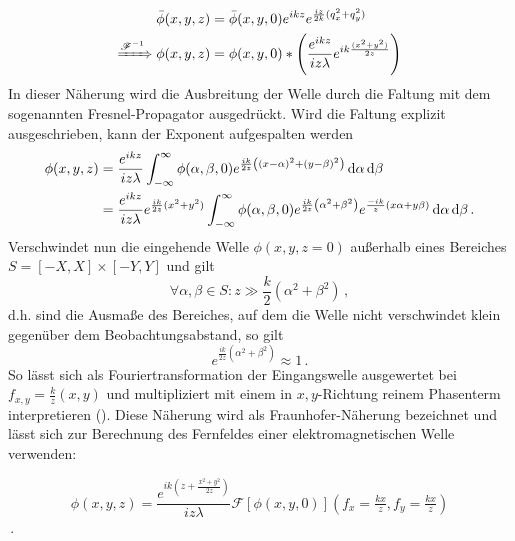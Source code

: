 \begin{align}
	\bar{\phi}(x,y, z) &=\bar{\phi}(x,y,0) e^{ik z}e^{\frac{i z}{2k}(q_x^2+q_y^2)} 
	\label{eq:fresnel_fourier}\\
	\xRightarrow{\mathscr{F}^{-1}}  \phi(x,y, z) &=\phi(x,y,0) \ast \left( \frac{e^{ik z}}{i z \lambda } e^{ik\frac{(x^2+y^2)}{2 z}} \right)
	\label{eq:fresnel_real}
\end{align}
In dieser Näherung wird die Ausbreitung der Welle durch die Faltung mit dem sogenannten Fresnel-Propagator ausgedrückt. Wird die Faltung explizit ausgeschrieben, kann der Exponent aufgespalten werden
\begin{align}
\label{eq:fresnel_explizit}
	\phi(x,y, z) & =\frac{e^{ikz}}{iz\lambda}                           
	\int_{-\infty}^\infty 
	\phi(\alpha,\beta,0)
	e^{\frac{ik}{2z}\left(\left(x-\alpha\right)^2+\left(y-\beta\right)^2\right)}
	\dif \alpha \dif \beta \nonumber \\
	             & =\frac{e^{ikz}}{iz\lambda}e^{\frac{ik}{2z}(x^2+y^2)} 
	\int_{-\infty}^\infty 
	\phi(\alpha,\beta,0)
	e^{\frac{ik}{2z}\left(\alpha^2+\beta^2\right)}
	e^{\frac{-ik}{ z}\left(x\alpha+y\beta\right)}
	\dif \alpha \dif \beta \,.
\end{align}
Verschwindet nun die eingehende Welle $\phi(x,y,z=0)$ außerhalb eines Bereiches $S=[-X,X]\times[-Y,Y]$ und gilt 
\begin{equation}
	\forall \alpha,\beta \in S:	z\gg \frac{k}{2}\left(\alpha^2+\beta^2\right) \, , 
\end{equation}
d.h. sind die Ausmaße des Bereiches, auf dem die Welle nicht verschwindet klein gegenüber dem Beobachtungsabstand, so gilt
\begin{equation}
	e^{\frac{ik}{2z}\left(\alpha^2+\beta^2\right)}\approx 1 \,.
\end{equation}
So lässt sich  als Fouriertransformation der Eingangswelle ausgewertet bei $f_{x,y}=\tfrac{k}{z}(x,y)$ und multipliziert mit einem in $x,y$-Richtung reinem Phasenterm interpretieren (). Diese Näherung wird als Fraunhofer-Näherung bezeichnet und lässt sich zur Berechnung des Fernfeldes einer elektromagnetischen Welle verwenden:

\begin{equation}
\label{eq:fraunhofer}
	\phi(x,y,z)=\frac{e^{ik(z+\frac{x^2+y^2}{2z})}}{iz\lambda}\mathscr{F}\left[\phi(x,y,0)\right](f_x=\tfrac{kx}{z},f_y=\tfrac{kx}{z})
\end{equation}\,.


